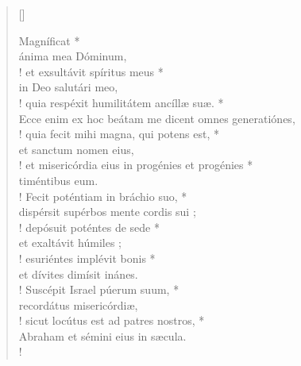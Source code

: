 \begin{verse}[\versewidth]
 


Magníficat *\\
ánima mea Dóminum,\\!
\vin et exsultávit spíritus meus *\\
\vin in Deo salutári meo,\\!
quia respéxit humilitátem ancíllæ suæ. *\\
Ecce enim ex hoc beátam me dicent omnes generatiónes,\\!
\vin quia fecit mihi magna, qui potens est, *\\
\vin et sanctum nomen eius,\\!
et misericórdia eius in progénies et progénies *\\
timéntibus eum.\\!
\vin Fecit poténtiam in bráchio suo, *\\
\vin dispérsit supérbos mente cordis sui ;\\!
depósuit poténtes de sede *\\
et exaltávit húmiles ;\\!
\vin esuriéntes implévit bonis *\\
\vin et dívites dimísit inánes.\\!
Suscépit Israel púerum suum, *\\
recordátus misericórdiæ,\\!
\vin sicut locútus est ad patres nostros, *\\
\vin Abraham et sémini eius in sæcula.\\!

\end{verse}










\newpage









